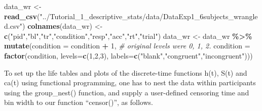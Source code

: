 \documentclass[
  man,floatsintext]{apa6}
\newenvironment{Shaded}{\begin{snugshade}}{\end{snugshade}}
\newcommand{\AttributeTok}[1]{\textcolor[rgb]{0.13,0.29,0.53}{#1}}
\newcommand{\CommentTok}[1]{\textcolor[rgb]{0.56,0.35,0.01}{\textit{#1}}}
\newcommand{\DecValTok}[1]{\textcolor[rgb]{0.00,0.00,0.81}{#1}}
\newcommand{\FunctionTok}[1]{\textcolor[rgb]{0.13,0.29,0.53}{\textbf{#1}}}
\newcommand{\NormalTok}[1]{#1}
\newcommand{\OtherTok}[1]{\textcolor[rgb]{0.56,0.35,0.01}{#1}}
\newcommand{\SpecialCharTok}[1]{\textcolor[rgb]{0.81,0.36,0.00}{\textbf{#1}}}
\newcommand{\StringTok}[1]{\textcolor[rgb]{0.31,0.60,0.02}{#1}}
\begin{document}
\begin{Shaded}
\begin{Highlighting}[]
\NormalTok{data\_wr }\OtherTok{\textless{}{-}} \FunctionTok{read\_csv}\NormalTok{(}\StringTok{"../Tutorial\_1\_descriptive\_stats/data/DataExp1\_6subjects\_wrangled.csv"}\NormalTok{)}
\FunctionTok{colnames}\NormalTok{(data\_wr) }\OtherTok{\textless{}{-}} \FunctionTok{c}\NormalTok{(}\StringTok{"pid"}\NormalTok{,}\StringTok{"bl"}\NormalTok{,}\StringTok{"tr"}\NormalTok{,}\StringTok{"condition"}\NormalTok{,}\StringTok{"resp"}\NormalTok{,}\StringTok{"acc"}\NormalTok{,}\StringTok{"rt"}\NormalTok{,}\StringTok{"trial"}\NormalTok{) }
\NormalTok{data\_wr }\OtherTok{\textless{}{-}}\NormalTok{ data\_wr }\SpecialCharTok{\%\textgreater{}\%} 
  \FunctionTok{mutate}\NormalTok{(}\AttributeTok{condition =}\NormalTok{ condition }\SpecialCharTok{+} \DecValTok{1}\NormalTok{, }\CommentTok{\# original levels were 0, 1, 2.}
         \AttributeTok{condition =} \FunctionTok{factor}\NormalTok{(condition, }\AttributeTok{levels=}\FunctionTok{c}\NormalTok{(}\DecValTok{1}\NormalTok{,}\DecValTok{2}\NormalTok{,}\DecValTok{3}\NormalTok{), }\AttributeTok{labels=}\FunctionTok{c}\NormalTok{(}\StringTok{"blank"}\NormalTok{,}\StringTok{"congruent"}\NormalTok{,}\StringTok{"incongruent"}\NormalTok{)))}
\end{Highlighting}
\end{Shaded}

\normalsize

To set up the life tables and plots of the discrete-time functions h(t), S(t) and ca(t) using functional programming, one has to nest the data within participants using the group\_nest() function, and supply a user-defined censoring time and bin width to our function ``censor()'', as follows.

\scriptsize
\end{document}

